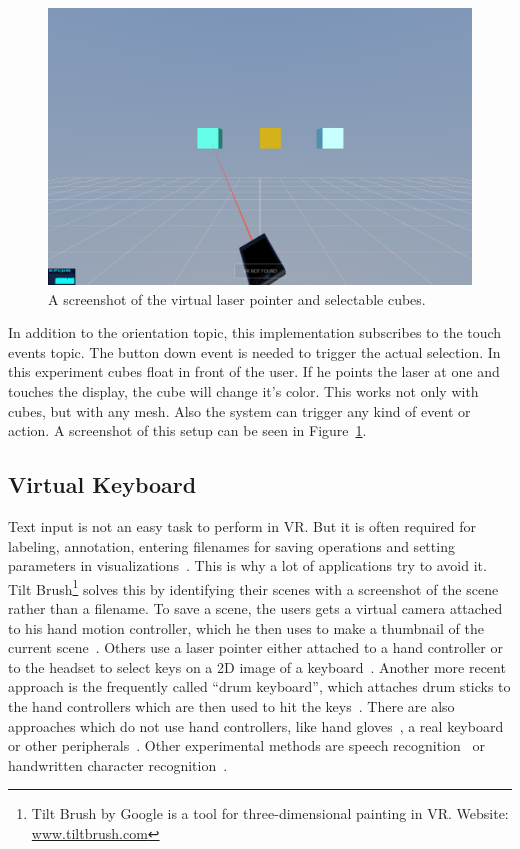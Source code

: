 \begin{figure}[htpb]
  \centering
  \includegraphics[width=12cm]{figures/screenshot_exp_lp.png}
  \caption[Screenshot: laser pointer experiment]{A screenshot of the virtual laser pointer and selectable cubes.}\label{fig:screenshot-exp-lp}
\end{figure}

In addition to the orientation topic, this implementation subscribes to the touch events topic. The button down event is needed to trigger the actual selection.
In this experiment cubes float in front of the user. If he points the laser at one and touches the display, the cube will change it's color. This works not only with cubes, but with any mesh. Also the system can trigger any kind of event or action. A screenshot of this setup can be seen in Figure~\ref{fig:screenshot-exp-lp}.


\subsection{Virtual Keyboard}\label{subsection:virtual-keyboard}

Text input is not an easy task to perform in \ac{VR}. But it is often required for labeling, annotation, entering filenames for saving operations and setting parameters in visualizations~\cite[2154]{Rhoton.2002}. This is why a lot of applications try to avoid it. Tilt Brush\footnote{Tilt Brush by Google is a tool for three-dimensional painting in VR. Website: \href{https://www.tiltbrush.com/}{www.tiltbrush.com}} solves this by identifying their scenes with a screenshot of the scene rather than a filename. To save a scene, the users gets a virtual camera attached to his hand motion controller, which he then uses to make a thumbnail of the current scene~\cite{GoogleLLC.2019}. Others use a laser pointer either attached to a hand controller or to the headset to select keys on a \ac{2D} image of a keyboard~\cite{WeelcoInc.2017}. Another more recent approach is the frequently called \enquote{drum keyboard}, which attaches drum sticks to the hand controllers which are then used to hit the keys~\cite{Weisel.2017}. 
There are also approaches which do not use hand controllers, like hand gloves~\cite{Evans.1999,Rhoton.2002}, a real keyboard~\cite{McGill.2015,Walker.2017} or other peripherals~\cite[111, 112]{Gonzalez.2009}. Other experimental methods are speech recognition~\cite[2154, 2156]{Rhoton.2002} or handwritten character recognition~\cite[113]{Gonzalez.2009}.

